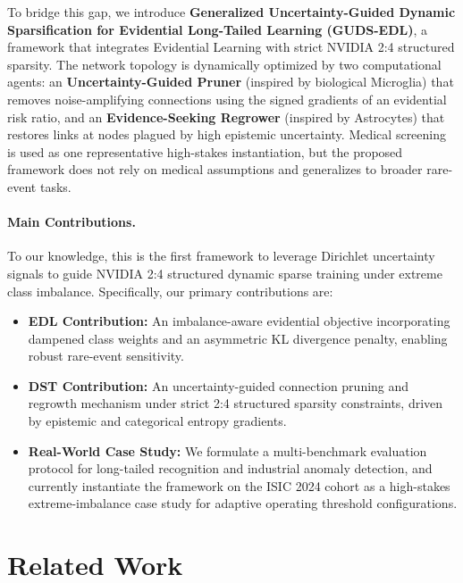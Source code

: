 \documentclass[letterpaper]{article} %
\begin{document}
To bridge this gap, we introduce \textbf{Generalized Uncertainty-Guided Dynamic Sparsification for Evidential Long-Tailed Learning (GUDS-EDL)}, a framework that integrates Evidential Learning with strict NVIDIA 2:4 structured sparsity. The network topology is dynamically optimized by two computational agents: an \textbf{Uncertainty-Guided Pruner} (inspired by biological Microglia) that removes noise-amplifying connections using the signed gradients of an evidential risk ratio, and an \textbf{Evidence-Seeking Regrower} (inspired by Astrocytes) that restores links at nodes plagued by high epistemic uncertainty. Medical screening is used as one representative high-stakes instantiation, but the proposed framework does not rely on medical assumptions and generalizes to broader rare-event tasks.

\paragraph{Main Contributions.} To our knowledge, this is the first framework to leverage Dirichlet uncertainty signals to guide NVIDIA 2:4 structured dynamic sparse training under extreme class imbalance. Specifically, our primary contributions are:
\begin{itemize}
    \item \textbf{EDL Contribution:} An imbalance-aware evidential objective incorporating dampened class weights and an asymmetric KL divergence penalty, enabling robust rare-event sensitivity.
    \item \textbf{DST Contribution:} An uncertainty-guided connection pruning and regrowth mechanism under strict 2:4 structured sparsity constraints, driven by epistemic and categorical entropy gradients.
    \item \textbf{Real-World Case Study:} We formulate a multi-benchmark evaluation protocol for long-tailed recognition and industrial anomaly detection, and currently instantiate the framework on the ISIC 2024 cohort as a high-stakes extreme-imbalance case study for adaptive operating threshold configurations.
\end{itemize}

\section{Related Work}\label{sec:related}
\end{document}
